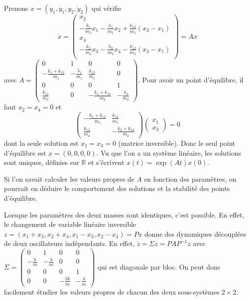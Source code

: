 Prenons \(x=(y_1,\dot{y}_1,y_2,\dot{y}_2)\) qui vérifie \[
\dot{x} = 
\left(
\begin{matrix}
x_2\\
-\frac{k_1}{m_1} x_1 -\frac{\lambda_1}{m_1} x_2 + \frac{k_{12}}{m_1}(x_3-x_1) \\
x_4\\
-\frac{k_2}{m_2} x_3 -\frac{\lambda_2}{m_2} x_4 - \frac{k_{12}}{m_2}(x_3-x_1) \\
\end{matrix}
\right) 
=
A x
\] avec
\(A=\left( \begin{matrix} 0&1&0&0\\ -\frac{k_1+k_{12}}{m_1}&-\frac{\lambda_1}{m_1}& \frac{k_{12}}{m_1} &0 \\ 0&0&0&1\\ \frac{k_{12}}{m_2}& 0 &-\frac{k_2+k_{12}}{m_2}&-\frac{\lambda_2}{m_2} \end{matrix} \right)\).
Pour avoir un point d'équilibre, il faut \(x_2=x_4=0\) et \[
\left(
\begin{matrix}
-\frac{k_1+k_{12}}{m_1}& \frac{k_{12}}{m_1} \\
\frac{k_{12}}{m_2} &-\frac{k_2+k_{12}}{m_2}
\end{matrix}
\right)
\left(
\begin{matrix}
x_1 \\ x_3
\end{matrix}
\right)
=0
\] dont la seule solution est \(x_1=x_3=0\) (matrice inversible). Donc
le seul point d'équilibre est \(x=(0,0,0,0)\). Vu que l'on a un système
linéaire, les solutions sont uniques, définies sur \(\mathbb{R}\) et
s'écrivent \(x(t) = \exp(At)x(0)\).

Si l'on savait calculer les valeurs propres de \(A\) en fonction des
paramètres, on pourrait en déduire le comportement des solutions et la
stabilité des points d'équilibre.

Lorsque les paramètres des deux masses sont identiques, c'est possible.
En effet, le changement de variable linéaire inversible
\(z=(x_1+x_3,x_2+x_4,x_1-x_3,x_2-x_4)=Px\) donne des dynamiques
découplées de deux oscillateurs indépendants. En effet,
\(\dot{z}=\Sigma z=PAP^{-1}z\) avec
\(\Sigma=\left( \begin{matrix} 0&1&0&0\\ -\frac{k}{m}&-\frac{\lambda}{m}& 0 &0 \\ 0&0&0&1\\ 0& 0 &-\frac{3 k}{m}&-\frac{\lambda}{m} \end{matrix} \right)\)
qui est diagonale par bloc. On peut donc facilement étudier les valeurs
propres de chacun des deux sous-systèmes \(2\times 2\).


